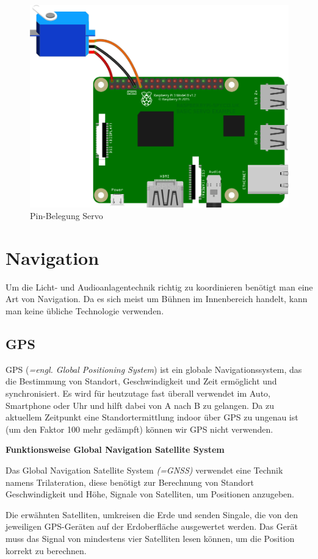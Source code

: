 \begin{figure}[H]
	\centering
	\includegraphics[width=0.7\linewidth]{images/Pin_Belegung.png}
	\caption[Pin-Belegung Servo]{Pin-Belegung Servo}
	\label{fig:PIN_Belegung}
\end{figure}

\section{Navigation}

Um die Licht- und Audioanlagentechnik richtig zu koordinieren benötigt man eine Art von Navigation. Da es sich meist um Bühnen im Innenbereich handelt, kann man keine übliche Technologie verwenden.


\subsection{GPS}
GPS (\textit{=engl. Global Positioning System}) ist ein globale Navigationssystem, das die Bestimmung von Standort, Geschwindigkeit und Zeit ermöglicht und synchronisiert. Es wird für heutzutage fast überall verwendet im Auto, Smartphone oder Uhr und hilft dabei von A nach B zu gelangen. \parencite{GPS} Da zu aktuellem Zeitpunkt eine Standortermittlung indoor über GPS zu ungenau ist (um den Faktor 100 mehr gedämpft) können wir GPS nicht verwenden. \textcite{Indoor}

\textbf{Funktionsweise Global Navigation Satellite System}

Das Global Navigation Satellite System \textit{(=GNSS)} verwendet eine Technik namens Trilateration, diese benötigt zur Berechnung von Standort Geschwindigkeit und Höhe, Signale von Satelliten, um Positionen anzugeben. 

Die erwähnten Satelliten, umkreisen die Erde und senden Singale, die von den jeweiligen GPS-Geräten auf der Erdoberfläche ausgewertet werden. Das Gerät muss das Signal von mindestens vier Satelliten lesen können, um die Position korrekt zu berechnen. \parencite{GPS} 


